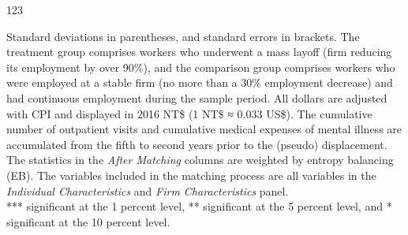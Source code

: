 \begin{table}[H]
    \caption{123}
    \center
    
\end{table}
\begin{singlespace}
    \begin{footnotesize}
     Standard deviations in parentheses, and standard errors in brackets. The treatment group comprises workers who underwent a mass layoff (firm reducing its employment by over 90\%), and the comparison group comprises workers who were employed at a stable firm (no more than a 30\% employment decrease) and had continuous employment during the sample period. All dollars are adjusted with CPI and displayed in 2016 NT\$ (1 NT\$ ≈ 0.033 US\$). The cumulative number of outpatient visits and cumulative medical expenses of mental illness are accumulated from the fifth to second years prior to the (pseudo) displacement. The statistics in the {\it After Matching} columns are weighted by entropy balancing (EB). The variables included in the matching process are all variables in the {\it Individual Characteristics} and {\it Firm Characteristics} panel. \\
    *** significant at the 1 percent level, ** significant at the 5 percent level, and * significant at the 10 percent level.
    \end{footnotesize}
\end{singlespace}

% 

